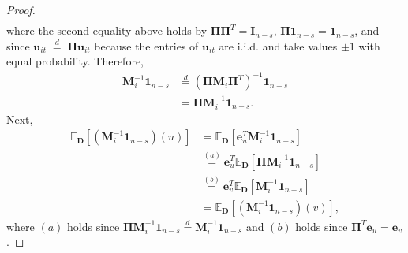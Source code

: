 \documentclass[journal,draftcls,onecolumn]{IEEEtran}
\theoremstyle{mystyle}
\newcommand{\bfD}{\mathbf{D}}
\begin{document}
\begin{proof}
\begin{align*}
\end{align*}
where the second equality above holds by $\mathbf{\Pi}\mathbf{\Pi}^T = \mathbf{I}_{n-s}$, $\mathbf{\Pi} \mathbf{1}_{n-s} = \mathbf{1}_{n-s}$, and since $\mathbf{u}_{it} \;\stackrel{d}{=}\; \mathbf{\Pi}\mathbf{u}_{it}$ because the entries of $\mathbf{u}_{it}$ are i.i.d. and take values $\pm 1$ with equal probability. Therefore, %
\begin{align*}
\mathbf{M}_i^{-1} \mathbf{1}_{n-s} &\overset{d}= (\mathbf{\Pi} \mathbf{M}_i \mathbf{\Pi}^T)^{-1} \mathbf{1}_{n-s} \\
& = \mathbf{\Pi} \mathbf{M}_i^{-1} \mathbf{1}_{n-s}.
\end{align*}
Next,
\begin{align*}
\mathbb{E}_{\mathbf{D}} [ (\mathbf{M}_i^{-1}\mathbf{1}_{n-s})(u)] & = \mathbb{E}_{\mathbf{D}} [\mathbf{e}_u^T \mathbf{M}_i^{-1}\mathbf{1}_{n-s}]\\
& \overset{(a)}{=} \mathbf{e}_u^T \mathbb{E}_{\mathbf{D}} [\mathbf{\Pi} \mathbf{M}_i^{-1}\mathbf{1}_{n-s}]\\
& \overset{(b)}{=} \mathbf{e}_v^T \mathbb{E}_{\mathbf{D}} [ \mathbf{M}_i^{-1}\mathbf{1}_{n-s}]\\
& = \mathbb{E}_{\mathbf{D}} [ (\mathbf{M}_i^{-1}\mathbf{1}_{n-s})(v)],
\end{align*}
where $(a)$ holds since $\mathbf{\Pi}\mathbf{M}_i^{-1} \mathbf{1}_{n-s} \overset{d} = \mathbf{M}_i^{-1} \mathbf{1}_{n-s}$ and $(b)$ holds since $\mathbf{\Pi}^T \mathbf{e}_u = \mathbf{e}_v$.

\end{proof}
\end{document}
